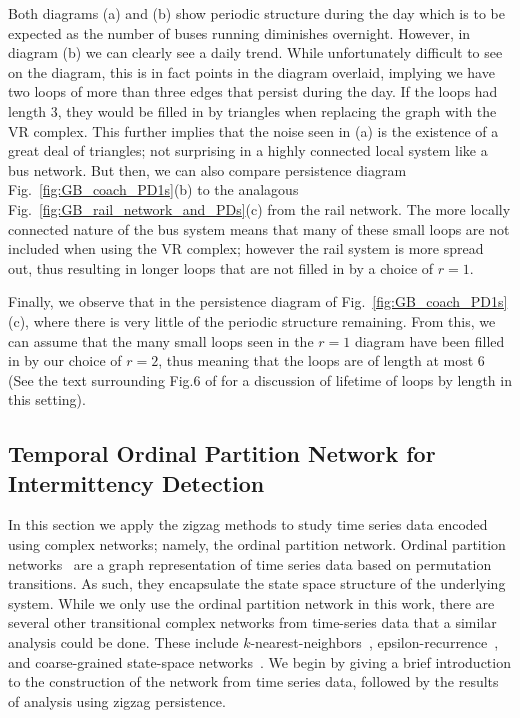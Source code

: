Both diagrams (a) and (b) show periodic structure during the day which is to be expected as the number of buses running diminishes overnight. 
However, in diagram (b) we can clearly see a daily trend. 
While unfortunately difficult to see on the diagram, this is in fact points in the diagram overlaid, implying we have two loops of more than three edges that persist during the day. 
If the loops had length 3, they would be filled in by triangles when replacing the graph with the VR complex. 
This further implies that the noise seen in (a) is the existence of a great deal of triangles; not surprising in a highly connected local system like a bus network. 
But then, we can also compare persistence diagram Fig.~\ref{fig:GB_coach_PD1s}(b) to the analagous Fig.~\ref{fig:GB_rail_network_and_PDs}(c) from the rail network. 
The more locally connected nature of the bus system means that many of these small loops are not included when using the VR complex; however the rail system is more spread out, thus resulting in longer loops that are not filled in by a choice of $r=1$. 

Finally, we observe that in the persistence diagram of Fig.~\ref{fig:GB_coach_PD1s}(c), where there is very little of the periodic structure remaining. 
From this, we can assume that the many small loops seen in the $r=1$ diagram have been filled in by our choice of $r=2$, thus meaning that the loops are of length at most 6 (See the text surrounding Fig.6 of \cite{Myers2019} for a discussion of lifetime of loops by length in this setting).




%
%
%


\subsection{Temporal Ordinal Partition Network for Intermittency Detection} 
\label{ssec:TOPN_results}

In this section we apply the zigzag methods to study time series data encoded using complex networks; namely, the ordinal partition network.
Ordinal partition networks~\cite{McCullough2015} are a graph representation of time series data based on permutation transitions. 
As such, they encapsulate the state space structure of the underlying system. 
While we only use the ordinal partition network in this work, there are several other transitional complex networks from time-series data that a similar analysis could be done. These include $k$-nearest-neighbors~\cite{Khor2016}, epsilon-recurrence~\cite{Jacob2019}, and coarse-grained state-space networks~\cite{Small2009a,Small2013a}.
We begin by giving a brief introduction to the construction of the network from time series data, followed by the results of analysis using zigzag persistence.

